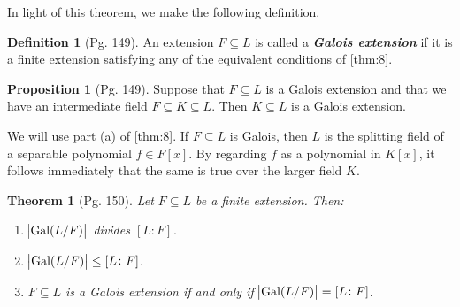 \documentclass[leqno]{article}
\makeatletter
\newtheorem{theorem}{Theorem}
\theoremstyle{definition}
\newtheorem{prop}{Proposition}
\newtheorem{definition}{Definition}
\theoremstyle{remark}
\let\oldproofname=\proofname
\renewcommand{\proofname}{\textit{\oldproofname}}
\theoremstyle{definition}
\renewenvironment{proof}[1][\proofname]{\par
  \pushQED{\qed}%
  \normalfont \topsep6\p@\@plus6\p@\relax
  \list{}{\leftmargin=0mm
          \rightmargin=0mm
          \settowidth{\itemindent}{\itshape#1}%
          \labelwidth=\itemindent
          \parsep=0pt \listparindent=0mm%
  }
  \item[\hskip\labelsep
        \itshape
    #1\@addpunct{.}]\ignorespaces
}{%
  \popQED\endlist\@endpefalse
}
\makeatother
\begin{document}
    In light of this theorem, we make the following definition.
    \begin{definition}[Pg. 149]\label{def:12}
        An extension $F\subseteq L$ is called a \textbf{\textit{Galois extension}} if it is a finite extension satisfying any of the equivalent conditions of \cref{thm:8}.
    \end{definition}\newpage
    \begin{prop}[Pg. 149]\label{prop:8}
        Suppose that $F\subseteq L$ is a Galois extension and that we have an intermediate field $F\subseteq K\subseteq L$. Then $K\subseteq L$ is a Galois extension.
    \end{prop}
        \begin{proof}
            We will use part (a) of \cref{thm:8}. If $F\subseteq L$ is Galois, then $L$ is the splitting field of a separable polynomial $f\in F[x]$. By regarding $f$ as a polynomial in $K[x]$, it follows immediately that the same is true over the larger field $K$.
        \end{proof}
    \begin{theorem}[Pg. 150]\label{thm:9}
        Let $F\subseteq L$ be a finite extension. Then:
            \begin{enumerate}[label=\normalfont{(\alph*)}]
                \item $\abs{\text{Gal}(L/F)}$ divides $[L\colon F]$.
                \item $\abs{\text{Gal}(L/F)}\leq[L\colon F]$.
                \item $F\subseteq L$ is a Galois extension if and only if $\abs{\text{Gal}(L/F)}=[L\colon F]$.
            \end{enumerate}
    \end{theorem}
\end{document}
